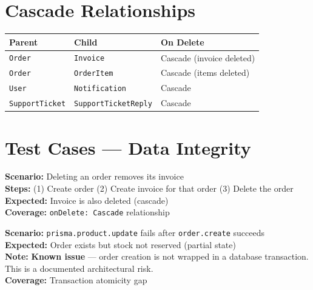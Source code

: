 \documentclass[12pt,a4paper]{report}
\newcommand{\pone}{\textbf{\color{p1red}P1}}
\begin{document}
\section{Cascade Relationships}

\begin{center}
\begin{tabular}{lll}
  \toprule
  \textbf{Parent} & \textbf{Child} & \textbf{On Delete} \\
  \midrule
  \texttt{Order}         & \texttt{Invoice}   & Cascade (invoice deleted) \\
  \texttt{Order}         & \texttt{OrderItem} & Cascade (items deleted) \\
  \texttt{User}          & \texttt{Notification} & Cascade \\
  \texttt{SupportTicket} & \texttt{SupportTicketReply} & Cascade \\
  \bottomrule
\end{tabular}
\end{center}

\section{Test Cases --- Data Integrity}

\begin{tcolorbox}[criticalbox, title={DB-004 \hfill \pone\ --- Cascade Delete}]
\textbf{Scenario:} Deleting an order removes its invoice \\
\textbf{Steps:} (1) Create order \quad (2) Create invoice for that order \quad (3) Delete the order \\
\textbf{Expected:} Invoice is also deleted (cascade) \\
\textbf{Coverage:} \texttt{onDelete: Cascade} relationship
\end{tcolorbox}

\begin{tcolorbox}[criticalbox, title={DB-007 \hfill \pone\ --- Atomicity Gap}]
\textbf{Scenario:} \texttt{prisma.product.update} fails after \texttt{order.create} succeeds \\
\textbf{Expected:} Order exists but stock not reserved (partial state) \\
\textbf{Note:} \textbf{Known issue} --- order creation is not wrapped in a database transaction. \\
This is a documented architectural risk. \\
\textbf{Coverage:} Transaction atomicity gap
\end{tcolorbox}
\end{document}
